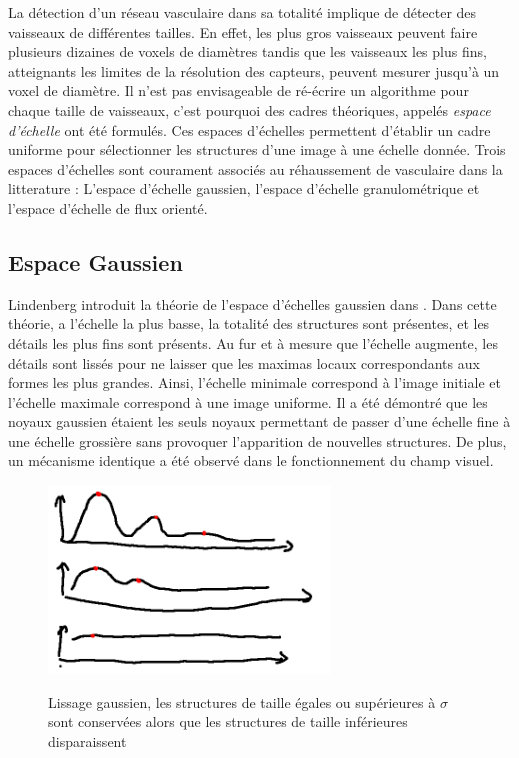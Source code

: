 La détection d'un réseau vasculaire dans sa totalité implique de détecter des vaisseaux de différentes tailles. En effet, les plus gros vaisseaux peuvent faire plusieurs dizaines de voxels de diamètres tandis que les vaisseaux les plus fins, atteignants les limites de la résolution des capteurs, peuvent  mesurer jusqu'à un voxel de diamètre. Il n'est pas envisageable de ré-écrire un algorithme pour chaque taille de vaisseaux, c'est pourquoi des cadres théoriques, appelés \emph{espace d'échelle} ont été formulés. Ces espaces d'échelles permettent d'établir un cadre uniforme pour sélectionner les structures d'une image à une échelle donnée. Trois espaces d'échelles sont courament associés au réhaussement de vasculaire dans la litterature : L'espace d'échelle gaussien, l'espace d'échelle granulométrique et l'espace d'échelle de flux orienté.

\subsection{Espace Gaussien}
\label{sec:EA:rehaussement:echelle:gaussien}

Lindenberg introduit la théorie de l'espace d'échelles gaussien dans \cite{lindeberg2013_scale}. Dans cette théorie, a l'échelle la plus basse, la totalité des structures sont présentes, et les détails les plus fins sont présents. Au fur et à mesure que l'échelle augmente, les détails sont lissés pour ne laisser que les maximas locaux correspondants aux formes les plus grandes. Ainsi, l'échelle minimale correspond à l'image initiale et l'échelle maximale correspond à une image uniforme. Il a été démontré que les noyaux gaussien étaient les seuls noyaux permettant de passer d'une échelle fine à une échelle grossière sans provoquer l'apparition de nouvelles structures. De plus, un mécanisme identique a été observé dans le fonctionnement du champ visuel.

\begin{figure}
  \centering
  \includegraphics[height=5cm]{Images/gaussian_smoothing.png}
  \label{fig:gaussian_smoothing}
  \caption{Lissage gaussien, les structures de taille égales ou supérieures à $\sigma$ sont conservées alors que les structures de taille inférieures disparaissent}
\end{figure}

